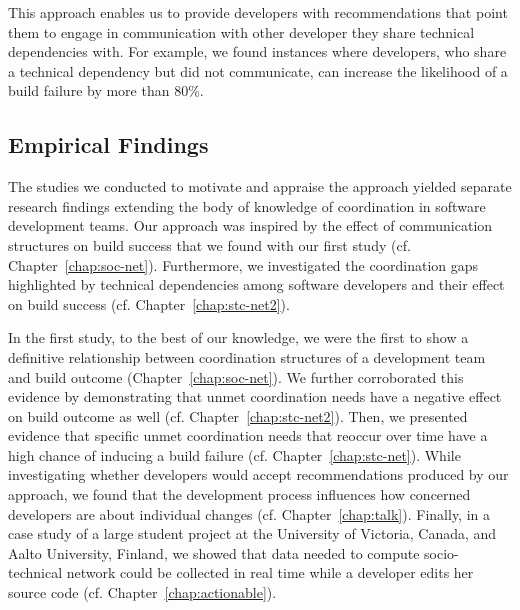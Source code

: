 This approach enables us to provide developers with recommendations that point them to engage in communication with other developer they share technical dependencies with.
For example, we found instances where developers, who share a technical dependency but did not communicate, can increase the likelihood of a build failure by more than 80\%.


\subsection{Empirical Findings}
The studies we conducted to motivate and appraise the approach yielded separate research findings extending the body of knowledge of coordination in software development teams. Our approach was inspired by the effect of communication structures on build success that we found with our first study (cf. Chapter~\ref{chap:soc-net}).
Furthermore, we investigated the coordination gaps highlighted by technical dependencies among software developers and their effect on build success (cf. Chapter~\ref{chap:stc-net2}).

In the first study, to the best of our knowledge, we were the first to show a definitive relationship between coordination structures of a development team and build outcome (Chapter~\ref{chap:soc-net}).
We further corroborated this evidence by demonstrating that unmet coordination needs have a negative effect on build outcome as well (cf. Chapter~\ref{chap:stc-net2}).
Then, we presented evidence that specific unmet coordination needs that reoccur over time have a high chance of inducing a build failure (cf. Chapter~\ref{chap:stc-net}).
While investigating whether developers would accept recommendations produced by our approach, we found that the development process influences how concerned developers are about individual changes (cf. Chapter~\ref{chap:talk}).
Finally, in a case study of a large student project at the University of Victoria, Canada, and Aalto University, Finland, we showed that data needed to compute socio-technical network could be collected in real time while a developer edits her source code (cf. Chapter~\ref{chap:actionable}).


